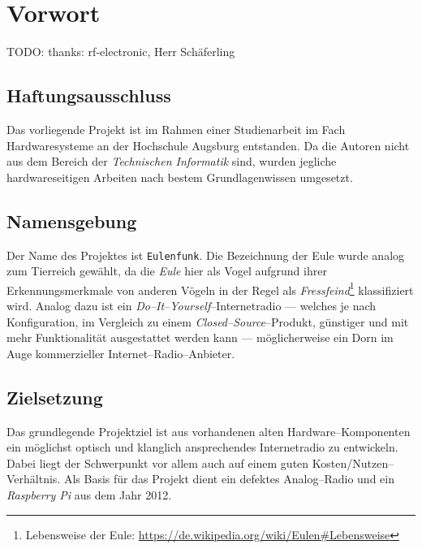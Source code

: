 \documentclass[11pt,ngerman,toc=listof,index=totoc]{scrreprt}
\begin{document}
{
\setcounter{tocdepth}{2}
\tableofcontents
}
\listoffigures
\newpage

 \setcounter{page}{1}

\chapter{Vorwort}\label{vorwort}

TODO: thanks: rf-electronic, Herr Schäferling

\section{Haftungsausschluss}\label{haftungsausschluss}

Das vorliegende Projekt ist im Rahmen einer Studienarbeit im Fach
Hardwaresysteme an der Hochschule Augsburg entstanden. Da die Autoren
nicht aus dem Bereich der \emph{Technischen Informatik} sind, wurden
jegliche hardwareseitigen Arbeiten nach bestem Grundlagenwissen
umgesetzt.

\section{Namensgebung}\label{namensgebung}

Der Name des Projektes ist \frqq\texttt{Eulenfunk}\flqq. Die Bezeichnung
der Eule wurde analog zum Tierreich gewählt, da die \emph{Eule} hier als
Vogel aufgrund ihrer Erkennungsmerkmale von anderen Vögeln in der Regel
als \emph{Fressfeind}\footnote{Lebensweise der Eule:
  \url{https://de.wikipedia.org/wiki/Eulen\#Lebensweise}} klassifiziert
wird. Analog dazu ist ein \emph{Do--It--Yourself}--Internetradio ---
welches je nach Konfiguration, im Vergleich zu einem
\emph{Closed--Source}--Produkt, günstiger und mit mehr Funktionalität
ausgestattet werden kann --- möglicherweise ein Dorn im Auge
kommerzieller Internet--Radio--Anbieter.

\section{Zielsetzung}\label{zielsetzung}

Das grundlegende Projektziel ist aus vorhandenen alten
Hardware--Komponenten ein möglichst optisch und klanglich ansprechendes
Internetradio zu entwickeln. Dabei liegt der Schwerpunkt vor allem auch
auf einem guten Kosten/Nutzen--Verhältnis. Als Basis für das Projekt
dient ein defektes Analog--Radio und ein \emph{Raspberry Pi} aus dem
Jahr 2012.
\end{document}
